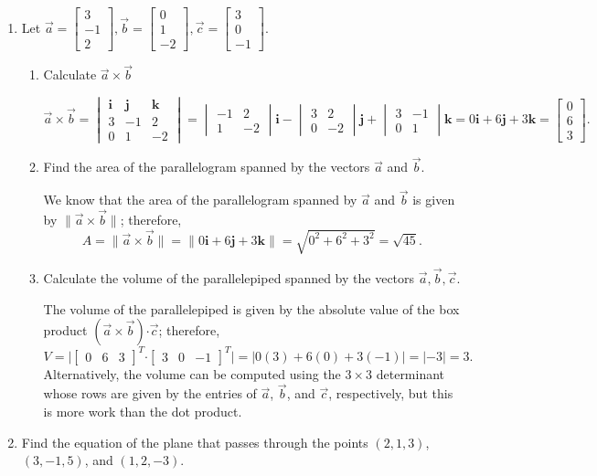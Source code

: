 \documentclass[12pt]{article}
\newcommand{\abs}[1]{\lvert #1\rvert}
\newcommand{\len}[1]{\lVert #1\rVert}
\renewcommand{\i}{\mathbf{i}}
\renewcommand{\j}{\mathbf{j}}
\renewcommand{\k}{\mathbf{k}}
\newcommand{\dotp}{\boldsymbol{\cdot}}
\newcommand{\bbm}{\begin{bmatrix}}
\newcommand{\ebm}{\end{bmatrix}}
\newcommand{\bvm}{\begin{vmatrix}}
\newcommand{\evm}{\end{vmatrix}}
\begin{document}
\thispagestyle{fancy}

 \begin{enumerate}
  \item Let $\vec{a} = \bbm 3\\-1\\2\ebm, \vec{b} = \bbm 0\\1\\-2\ebm, \vec{c} = \bbm 3\\0\\-1\ebm$.
\begin{enumerate}
 \item Calculate $\vec{a}\times\vec{b}$

\[
 \vec{a}\times\vec{b}  = \bvm \i&\j&\k\\3&-1&2\\0&1&-2\evm = \bvm -1&2\\1&-2\evm\i - \bvm 3&2\\0&-2\evm\j + \bvm 3&-1\\0&1\evm\k = 0\i+6\j+3\k = \bbm 0\\6\\3\ebm.
\]


 \item Find the area of the parallelogram spanned by the vectors $\vec{a}$ and $\vec{b}$.

\bigskip

We know that the area of the parallelogram spanned by $\vec{a}$ and $\vec{b}$ is given by $\len{\vec{a}\times\vec{b}}$; therefore,
\[
 A = \len{\vec{a}\times\vec{b}} = \len{0\i+6\j+3\k} = \sqrt{0^2+6^2+3^2} = \sqrt{45}.
\]


 \item Calculate the volume of the parallelepiped spanned by the vectors $\vec{a},\vec{b},\vec{c}$.

The volume of the parallelepiped is given by the absolute value of the box product $(\vec{a}\times\vec{b})\dotp \vec{c}$; therefore,
\[
 V = \abs{\bbm 0&6&3\ebm^T\dotp \bbm 3&0&-1\ebm^T} = \abs{0(3)+6(0)+3(-1)} = \abs{-3} = 3.
\]
Alternatively, the volume can be computed using the $3\times 3$ determinant whose rows are given by the entries of $\vec{a}$, $\vec{b}$, and $\vec{c}$, respectively, but this is more work than the dot product.


 \end{enumerate}


\item Find the equation of the plane that passes through the points $(2,1,3)$, $(3,-1,5)$, and $(1,2,-3)$.


\end{enumerate}
\end{document}
